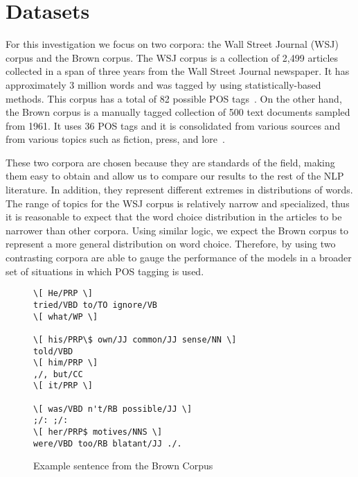 \section{Datasets}
\label{sec:datasets}
For this investigation we focus on two corpora: the Wall Street Journal (WSJ) corpus and the Brown corpus. The WSJ corpus is a collection of 2,499 articles collected in a span of three years from the Wall Street Journal newspaper. It has approximately 3 million words and was tagged by using statistically-based methods. This corpus has a total of 82 possible POS tags~\cite{wsjCorpus}. On the other hand, the Brown corpus is a manually tagged collection of 500 text documents sampled from 1961. It uses 36 POS tags and it is consolidated from various sources and from various topics such as fiction, press, and lore~\cite{wsjCorpus}.

These two corpora are chosen because they are standards of the field, making them easy to obtain and allow us to compare our results to the rest of the NLP literature. In addition, they represent different extremes in distributions of words. The range of topics for the WSJ corpus is relatively narrow and specialized, thus it is reasonable to expect that the word choice distribution in the articles to be narrower than other corpora. Using similar logic, we expect the Brown corpus to represent a more general distribution on word choice. Therefore, by using two contrasting corpora are able to gauge the performance of the models in a broader set of situations in which POS tagging is used.

\begin{figure}[ht]
 \begin{Verbatim}[frame=single,framesep=5mm]
\[ He/PRP \]
tried/VBD to/TO ignore/VB
\[ what/WP \]

\[ his/PRP\$ own/JJ common/JJ sense/NN \]
told/VBD
\[ him/PRP \]
,/, but/CC
\[ it/PRP \]

\[ was/VBD n't/RB possible/JJ \]
;/: ;/:
\[ her/PRP$ motives/NNS \]
were/VBD too/RB blatant/JJ ./.
\end{Verbatim}
\caption{Example sentence from the Brown Corpus~\cite{brownCorpus} \label{brownExample}}
\end{figure}
